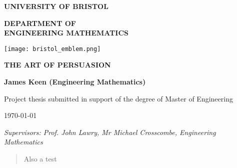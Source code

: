 \documentclass[a4paper]{article}
\begin{document}
\begin{titlepage}

\begin{center}
    \textbf{\LARGE UNIVERSITY OF BRISTOL}
    
    \vspace{3em}
    
    \textbf{\Huge DEPARTMENT OF \\ \vspace{0.5em} ENGINEERING MATHEMATICS}
    
\end{center}
\vspace{3cm}

\center
\texttt{[image: bristol\_emblem.png]}\par\vspace{1cm}

\vspace{2.5cm}

{ \huge \bfseries THE ART OF PERSUASION
}\\

\vspace{3cm}

{ \large \bfseries James Keen (Engineering Mathematics)
}\\

\vspace{2cm}

{\large Project thesis submitted in support of the degree of Master of Engineering}

\vspace{1cm}

\today

\vspace{0.5em}


\raggedright \textit{Supervisors: Prof. John Lawry, Mr Michael Crosscombe,  Engineering Mathematics}

\end{titlepage}

\begin{abstract}
    
Also a test
\end{abstract}

\tableofcontents

\end{document}
